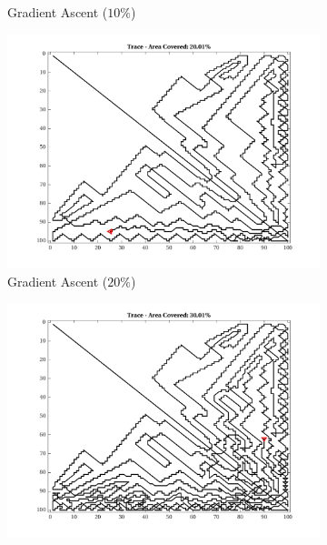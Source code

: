 \begin{figure}[htb!]
\begin{subfigure}[t]{0.32\textwidth}
        \ssp
        \captionsetup{skip=0.20\baselineskip,size=footnotesize}
        \caption{Gradient Ascent ($10\%$)}
    \end{subfigure}%
    \begin{subfigure}[t]{0.32\textwidth}
        \centering
        \includegraphics[width=\linewidth]{figures/hbresults/path_gradient_20p_100x100_sf_100_seed_2.png}
        \ssp
        \captionsetup{skip=0.20\baselineskip,size=footnotesize}
        \caption{Gradient Ascent ($20\%$)}
    \end{subfigure}%
    \begin{subfigure}[t]{0.32\textwidth}
        \centering
        \includegraphics[width=\linewidth]{figures/hbresults/path_gradient_30p_100x100_sf_100_seed_2.png}

\end{subfigure}
\end{figure}

